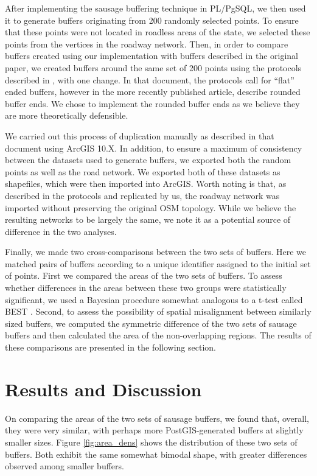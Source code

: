 \documentclass[11pt,letterpaper]{article} %
\begin{document}
After implementing the sausage buffering technique in PL/PgSQL, we
then used it to generate buffers originating from 200 randomly
selected points. To ensure that these points were not located in
roadless areas of the state, we selected these points from the
vertices in the roadway network. Then, in order to compare buffers
created using our implementation with buffers described in the
original \citeauthor{Forsyth2014sausage} paper, we created buffers
around the same set of 200 points using the protocols described in
\textcite{Forsyth2012proto}, with one change. In that document, the
protocols call for ``flat'' ended buffers, however in the more
recently published article, \citeauthor{Forsyth2014sausage} describe
rounded buffer ends. We chose to implement the rounded buffer ends as
we believe they are more theoretically defensible.

We carried out this process of duplication manually as described in
that document using ArcGIS 10.X. In addition, to ensure a maximum of
consistency between the datasets used to generate buffers, we exported
both the random points as well as the road network. We exported both
of these datasets as shapefiles, which were then imported into
ArcGIS. Worth noting is that, as described in the
\textcite{Forsyth2012proto} protocols and replicated by us, the
roadway network was imported without preserving the original OSM
topology. While we believe the resulting networks to be largely the
same, we note it as a potential source of difference in the two
analyses.

Finally, we made two cross-comparisons between the two sets of
buffers. Here we matched pairs of buffers according to a unique
identifier assigned to the initial set of points. First we compared
the areas of the two sets of buffers. To assess whether differences in
the areas between these two groups were statistically significant, we
used a Bayesian procedure somewhat analogous to a t-test called BEST
\autocite{Kruschke2014,Kruschke2013}. Second, to assess the possibility of
spatial misalignment between similarly sized buffers, we computed the
symmetric difference of the two sets of sausage buffers and then
calculated the area of the non-overlapping regions. The results of
these comparisons are presented in the following section.


\section*{Results and Discussion}
On comparing the areas of the two sets of sausage buffers, we found
that, overall, they were very similar, with perhaps more
PostGIS-generated buffers at slightly smaller sizes. Figure
\ref{fig:area_dens} shows the distribution of these two sets of
buffers. Both exhibit the same somewhat bimodal shape, with greater
differences observed among smaller buffers. 
\end{document}
